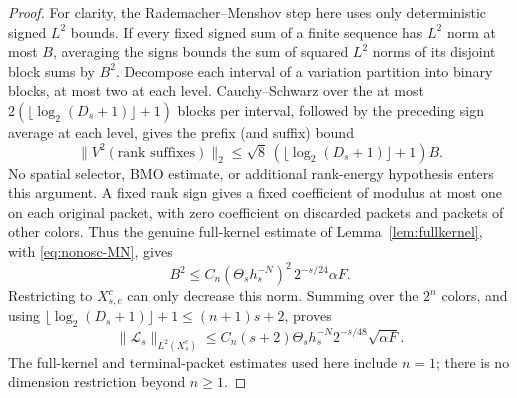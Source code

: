 \documentclass[11pt]{article}
\numberwithin{equation}{section}
\theoremstyle{remark}
\theoremstyle{definition}
\begin{document}
\begin{proof}
For clarity, the Rademacher--Menshov step here uses only deterministic
signed $L^2$ bounds.  If every fixed signed sum of a finite sequence has
$L^2$ norm at most $B$, averaging the signs bounds the sum of squared
$L^2$ norms of its disjoint block sums by $B^2$.  Decompose each interval
of a variation partition into binary blocks, at most two at each level.
Cauchy--Schwarz over the at most $2(\lfloor\log_2(D_s+1)\rfloor+1)$
blocks per interval, followed by the preceding sign average at each
level, gives the prefix (and suffix) bound
\[
 \|V^2(\text{rank suffixes})\|_2
 \le\sqrt8\,(\lfloor\log_2(D_s+1)\rfloor+1)B.
\]
No spatial selector, BMO estimate, or additional rank-energy hypothesis
enters this argument.  A fixed rank sign gives a fixed coefficient of
modulus at most one on each original packet, with zero coefficient on
discarded packets and packets of other colors.  Thus the genuine
full-kernel estimate of Lemma~\ref{lem:fullkernel}, with
\eqref{eq:nonosc-MN}, gives
\[
 B^2\le C_n(\Theta_sh_s^{-N})^2\,2^{-s/24}\alpha F.
\]
Restricting to $X_{s,c}^c$ can only decrease this norm.  Summing over the
$2^n$ colors, and using
$\lfloor\log_2(D_s+1)\rfloor+1\le(n+1)s+2$, proves
\begin{equation}\label{eq:nonosclong}
 \|\mathcal L_s\|_{L^2(X_s^c)}
 \le C_n(s+2)\Theta_sh_s^{-N}2^{-s/48}\sqrt{\alpha F}.
\end{equation}
The full-kernel and terminal-packet estimates used here include $n=1$;
there is no dimension restriction beyond $n\ge1$.


\end{proof}
\end{document}
